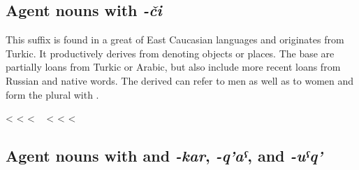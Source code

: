 
\subsection{Agent nouns with \textit{-či}}
\label{subsection:Agent \isi{nouns} with -či}

This suffix is found in a great  of East Caucasian languages and originates from Turkic. It productively derives   from  denoting objects or places. The base  are partially loans from Turkic or Arabic, but also include more recent loans from Russian and native words. The derived  can refer to men as well as to women and form the plural with .
%
\begin{exe}
	\ex	\label{masqaranjoke}
	\begin{xlist}
		\TabPositions{14em,16em}
		\ex	{} 		\tab	<	\tab	{} 
		\ex	{} 			\tab	<	\tab	{} 
		\ex	{} 			\tab	<	\tab	{} 		
		\ex	{} 
		\sn	~\hspace*{1em}						\tab	<	\tab	{} 
		\ex	{} 				\tab	<	\tab	{} 
		\ex	{} 		\tab	<	\tab	{} 
	\end{xlist}
\end{exe}



\subsection{Agent nouns with and \textit{-kar}, \textit{-q'aˁ}, and \textit{-uˁq'}}
\label{ssec:Agent \isi{nouns} with -q'aˁ, -uˁq' and -kar}

